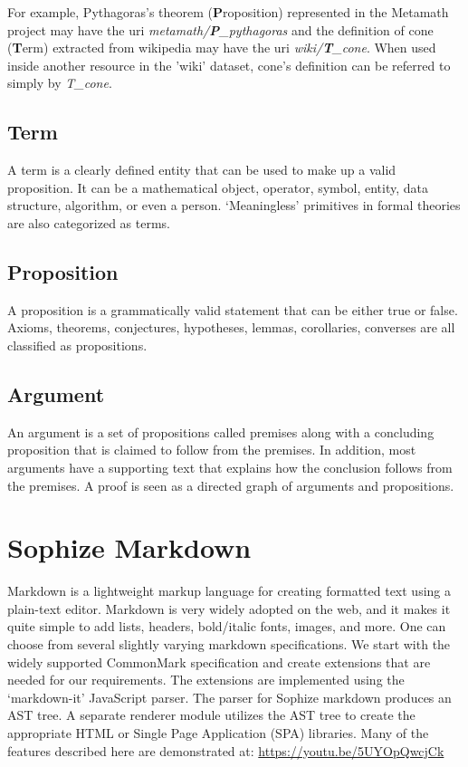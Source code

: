 \documentclass[a4paper]{article}
\begin{document}
For example, Pythagoras's theorem (\textbf{P}roposition) represented in the Metamath project may have the uri \emph{metamath/\textbf{P}\_pythagoras} and the definition of cone (\textbf{T}erm) extracted from wikipedia may have the uri \emph{wiki/\textbf{T}\_cone}. When used inside another resource in the 'wiki' dataset, cone's definition can be referred to simply by \emph{T\_cone}.


\subsection*{Term}

A term is a clearly defined entity that can be used to make up a valid proposition. It can be a mathematical object, operator, symbol, entity, data structure, algorithm, or even a person. `Meaningless' primitives in formal theories are also categorized as terms.


\subsection*{Proposition}

A proposition is a grammatically valid statement that can be either true or false. Axioms, theorems, conjectures, hypotheses, lemmas, corollaries, converses are all classified as propositions.


\subsection*{Argument}

An argument is a set of propositions called premises along with a concluding proposition that is claimed to follow from the premises. In addition, most arguments have a supporting text that explains how the conclusion follows from the premises. A proof is seen as a directed graph of arguments and propositions.


\section{Sophize Markdown}

Markdown is a lightweight markup language for creating formatted text using a plain-text editor. Markdown is very widely adopted on the web, and it makes it quite simple to add lists, headers, bold/italic fonts, images, and more. One can choose from several slightly varying markdown specifications. We start with the widely supported CommonMark specification and create extensions that are needed for our requirements. The extensions are implemented using the `markdown-it' \cite{markdown_it} JavaScript parser. The parser for Sophize markdown produces an AST tree. A separate renderer module utilizes the AST tree to create the appropriate HTML or Single Page Application (SPA) libraries. Many of the features described here are demonstrated at: \url{https://youtu.be/5UYOpQwcjCk}
\end{document}
